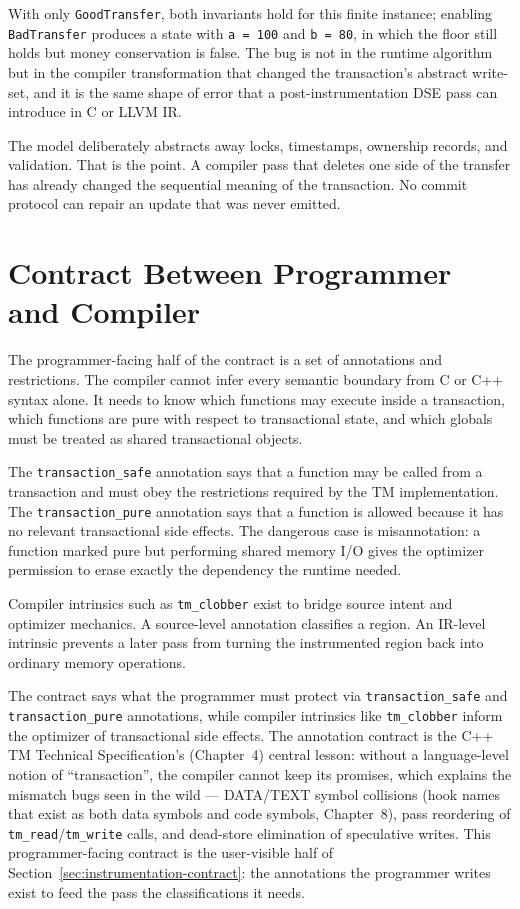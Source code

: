 With only \texttt{GoodTransfer}, both invariants hold for this finite instance; enabling \texttt{BadTransfer} produces a state with \texttt{a = 100} and \texttt{b = 80}, in which the floor still holds but money conservation is false. The bug is not in the runtime algorithm but in the compiler transformation that changed the transaction's abstract write-set, and it is the same shape of error that a post-instrumentation DSE pass can introduce in C or LLVM IR.

The model deliberately abstracts away locks, timestamps, ownership records, and validation. That is the point. A compiler pass that deletes one side of the transfer has already changed the sequential meaning of the transaction. No commit protocol can repair an update that was never emitted.

\section{Contract Between Programmer and Compiler}
\label{sec:contract-programmer-compiler}

The programmer-facing half of the contract is a set of annotations and restrictions. The compiler cannot infer every semantic boundary from C or C++ syntax alone. It needs to know which functions may execute inside a transaction, which functions are pure with respect to transactional state, and which globals must be treated as shared transactional objects.

The \texttt{transaction\_safe} annotation says that a function may be called from a transaction and must obey the restrictions required by the TM implementation. The \texttt{transaction\_pure} annotation says that a function is allowed because it has no relevant transactional side effects. The dangerous case is misannotation: a function marked pure but performing shared memory I/O gives the optimizer permission to erase exactly the dependency the runtime needed.

Compiler intrinsics such as \texttt{tm\_clobber} exist to bridge source intent and optimizer mechanics. A source-level annotation classifies a region. An IR-level intrinsic prevents a later pass from turning the instrumented region back into ordinary memory operations.

The contract says what the programmer must protect via \texttt{transaction\_safe} and \texttt{transaction\_pure} annotations, while compiler intrinsics like \texttt{tm\_clobber} inform the optimizer of transactional side effects. The annotation contract is the C++ TM Technical Specification's (Chapter~4) central lesson: without a language-level notion of ``transaction'', the compiler cannot keep its promises, which explains the mismatch bugs seen in the wild --- DATA/TEXT symbol collisions (hook names that exist as both data symbols and code symbols, Chapter~8), pass reordering of \texttt{tm\_read}\slash{}\texttt{tm\_write} calls, and dead-store elimination of speculative writes. This programmer-facing contract is the user-visible half of Section~\ref{sec:instrumentation-contract}: the annotations the programmer writes exist to feed the pass the classifications it needs.

